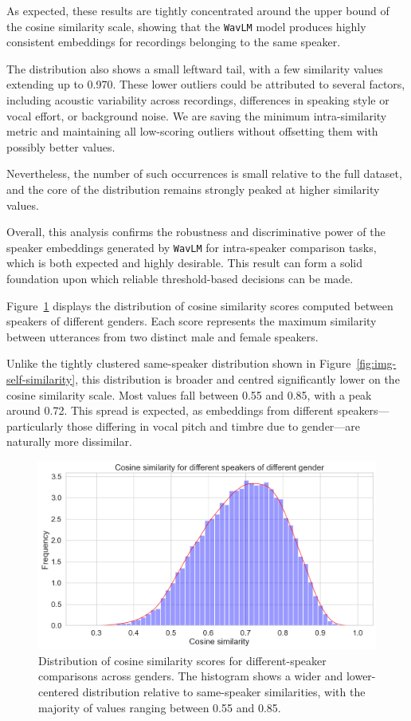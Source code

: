 \documentclass[conference]{IEEEtran}
\begin{document}
As expected, these results are tightly concentrated around the upper bound of the cosine similarity scale, showing that the \texttt{WavLM} model produces highly consistent embeddings for recordings belonging to the same speaker. 

The distribution also shows a small leftward tail, with a few similarity values extending up to 0.970. These lower outliers could be attributed to several factors, including acoustic variability across recordings, differences in speaking style or vocal effort, or background noise. We are saving the minimum intra-similarity metric and maintaining all low-scoring outliers without offsetting them with possibly better values.

Nevertheless, the number of such occurrences is small relative to the full dataset, and the core of the distribution remains strongly peaked at higher similarity values.

Overall, this analysis confirms the robustness and discriminative power of the speaker embeddings generated by \texttt{WavLM} for intra-speaker comparison tasks, which is both expected and highly desirable. This result can form a solid foundation upon which reliable threshold-based decisions can be made.


Figure~\ref{fig:img-similarity} displays the distribution of cosine similarity scores computed between speakers of different genders. Each score represents the maximum similarity between utterances from two distinct male and female speakers.

Unlike the tightly clustered same-speaker distribution shown in Figure~\ref{fig:img-self-similarity}, this distribution is broader and centred significantly lower on the cosine similarity scale. Most values fall between 0.55 and 0.85, with a peak around 0.72. This spread is expected, as embeddings from different speakers—particularly those differing in vocal pitch and timbre due to gender—are naturally more dissimilar.

\begin{figure}[H]
	\centering
	\includegraphics[width=0.7\linewidth]{img/img-similarity}
	\caption{Distribution of cosine similarity scores for different-speaker comparisons across genders. The histogram shows a wider and lower-centered distribution relative to same-speaker similarities, with the majority of values ranging between 0.55 and 0.85.}
	\label{fig:img-similarity}
\end{figure}
\end{document}

